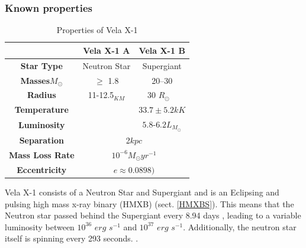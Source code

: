 \documentclass[12pt, a4paper]{article}
\begin{document}
    \begin{table} [H]
            \subsubsection{Known properties}
            \begin{center}
                \begin{tabular}{||c || c | c||} 
                 \hline
                 & Vela X-1 A & Vela X-1 B  \\ 
                 \hline\hline
                 \textbf{Star Type} & Neutron Star & Supergiant \parencite{Kretschmar_2021} \\ 
                 \hline
                 \textbf{Masses}\(M_\odot\) & $\ge$ 1.8 \parencite{Kretschmar_2021} & 20–30 \parencite{Kretschmar_2021} \\
                 \hline
                 \textbf{Radius} & 11-12.5$_{KM}$ \parencite{Kretschmar_2021} & 30 \(R_\odot\)
                ~\parencite{Kretschmar_2021} \\
                 \hline 
                 \textbf{Temperature} &  & $33.7 \pm 5.2 kK$ \parencite{Kretschmar_2021}\\ 
                 \hline
                 \textbf{Luminosity} & & $5.8$-$6.2 L_{M_\odot}$ \parencite{Kretschmar_2021} \\
                 \hline
                 \textbf{Separation} & \multicolumn{2}{c||}{2$kpc$ \parencite{Kretschmar_2021}} \\
                 \hline 
                 \textbf{Mass Loss Rate} & \multicolumn{2}{c||}{$10^{-6} M_\odot yr^{-1}$ \parencite{Kretschmar_2021}} \\
                 \hline
                 \textbf{Eccentricity} & \multicolumn{2}{c||}{$ e \approx  0.0898)$ \parencite{Kretschmar_2021}} \\
                 \hline
                \end{tabular}
                \caption{Properties of Vela X-1} 
                \label{VelaX1} 

            \end{center}
    \end{table}

        Vela X-1 consists of a Neutron Star and Supergiant and is an Eclipsing and pulsing high mass x-ray binary (HMXB)  (sect. \ref{HMXBS}). This means that the Neutron star passed behind the Supergiant every 8.94 days \parencite{Falanga_2015}, leading to a variable luminosity between $10^{36}$ $erg$ $s^{-1}$ and $10^{37}$ $erg$ $s^{-1}$. Additionally, the neutron star itself is spinning every 293 seconds. \parencite{Kretschmar_2021}. 
        
\end{document}

